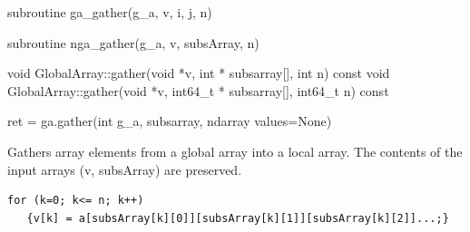 \documentclass[12pt]{article}
\begin{document}
\begin{f2dapi}
\begin{fcode}
subroutine ga_gather(g_a, v, i, j, n)
\end{fcode}
\begin{funcargs}
\end{funcargs}
\end{f2dapi}

\begin{fapi}
\begin{fcode}
subroutine nga_gather(g_a, v, subsArray, n)
\end{fcode}
\begin{funcargs}
\end{funcargs}
\end{fapi}

\begin{cxxapi}
\begin{cxxcode}
void GlobalArray::gather(void *v, int * subsarray[], int n) const
void GlobalArray::gather(void *v, int64_t * subsarray[], int64_t n) const
\end{cxxcode}
\begin{funcargs}
\end{funcargs}
\end{cxxapi}

\begin{pyapi}
\begin{pycode}
ret = ga.gather(int g_a, subsarray, ndarray values=None)
\end{pycode}
\begin{funcargs}
\end{funcargs}
\end{pyapi}

\ncoll

\begin{desc}

Gathers array elements from a global array into a local array. The contents of
the input arrays (v, subsArray) are preserved.

\begin{verbatim}
for (k=0; k<= n; k++)
   {v[k] = a[subsArray[k][0]][subsArray[k][1]][subsArray[k][2]]...;}
\end{verbatim}

\end{desc}
\end{document}
